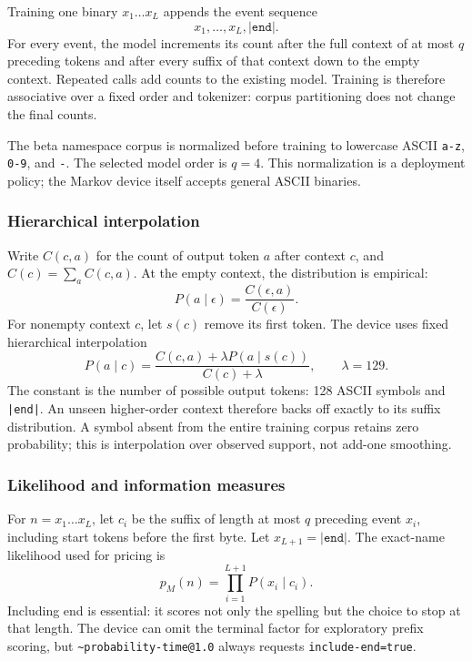 \documentclass[10pt,twocolumn]{article}
\newcommand{\device}[1]{\texttt{\textasciitilde#1}}
\newcommand{\key}[1]{\texttt{#1}}
\begin{document}
Training one binary $x_1\ldots x_L$ appends the event sequence
\[
  x_1,\ldots,x_L,\mathtt{|end|}.
\]
For every event, the model increments its count after the full context of at
most $q$ preceding tokens and after every suffix of that context down to the
empty context. Repeated calls add counts to the existing model. Training is
therefore associative over a fixed order and tokenizer: corpus partitioning
does not change the final counts.

The beta namespace corpus is normalized before training to lowercase ASCII
\key{a-z}, \key{0-9}, and \key{-}. The selected model order is $q=4$. This
normalization is a deployment policy; the Markov device itself accepts general
ASCII binaries.

\subsubsection{Hierarchical interpolation}

Write $C(c,a)$ for the count of output token $a$ after context $c$, and
$C(c)=\sum_a C(c,a)$. At the empty context, the distribution is empirical:
\[
  P(a\mid\epsilon)=\frac{C(\epsilon,a)}{C(\epsilon)}.
\]
For nonempty context $c$, let $s(c)$ remove its first token. The device uses
fixed hierarchical interpolation
\[
  P(a\mid c)=
  \frac{C(c,a)+\lambda P(a\mid s(c))}{C(c)+\lambda},
  \qquad \lambda=129.
\]
The constant is the number of possible output tokens: 128 ASCII symbols and
\key{|end|}. An unseen higher-order context therefore backs off exactly to its
suffix distribution. A symbol absent from the entire training corpus retains
zero probability; this is interpolation over observed support, not add-one
smoothing.

\subsubsection{Likelihood and information measures}\label{sec:information}

For $n=x_1\ldots x_L$, let $c_i$ be the suffix of length at most $q$ preceding
event $x_i$, including start tokens before the first byte. Let
$x_{L+1}=\mathtt{|end|}$. The exact-name likelihood used for pricing is
\[
  p_M(n)=\prod_{i=1}^{L+1} P(x_i\mid c_i).
\]
Including end is essential: it scores not only the spelling but the choice to
stop at that length. The device can omit the terminal factor for exploratory
prefix scoring, but \device{probability-time@1.0} always requests
\key{include-end=true}.
\end{document}
